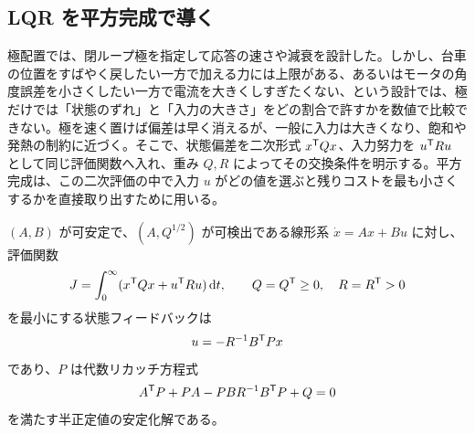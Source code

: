 \subsection{LQR を平方完成で導く}

極配置では、閉ループ極を指定して応答の速さや減衰を設計した。しかし、台車の位置をすばやく戻したい一方で加える力には上限がある、あるいはモータの角度誤差を小さくしたい一方で電流を大きくしすぎたくない、という設計では、極だけでは「状態のずれ」と「入力の大きさ」をどの割合で許すかを数値で比較できない。極を速く置けば偏差は早く消えるが、一般に入力は大きくなり、飽和や発熱の制約に近づく。そこで、状態偏差を二次形式 $x^{\mathsf{T}} Qx$、入力努力を $u^{\mathsf{T}} Ru$ として同じ評価関数へ入れ、重み $Q,R$ によってその交換条件を明示する。平方完成は、この二次評価の中で入力 $u$ がどの値を選ぶと残りコストを最も小さくするかを直接取り出すために用いる。

\begin{theorem}
$(A,B)$ が可安定で、$(A,Q^{1/2})$ が可検出である線形系 $\dot{x}=Ax+Bu$ に対し、評価関数
\begin{equation}
  J=\int_0^\infty (x^{\mathsf{T}} Qx+u^{\mathsf{T}} Ru)\,\mathrm{d} t,
  \qquad Q=Q^{\mathsf{T}}\ge0,
  \quad R=R^{\mathsf{T}}>0
\end{equation}
を最小にする状態フィードバックは
\begin{equation}
  u=-R^{-1}B^{\mathsf{T}} Px
\end{equation}
であり、$P$ は代数リカッチ方程式
\begin{equation}
  A^{\mathsf{T}} P+PA-PBR^{-1}B^{\mathsf{T}} P+Q=0
\end{equation}
を満たす半正定値の安定化解である。
\end{theorem}

